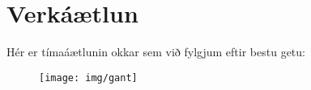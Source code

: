 ﻿\section{Verkáætlun}
Hér er tímaáætlunin okkar sem við fylgjum eftir bestu getu:
\begin{figure}[h]
\texttt{[image: img/gant]}
\end{figure}